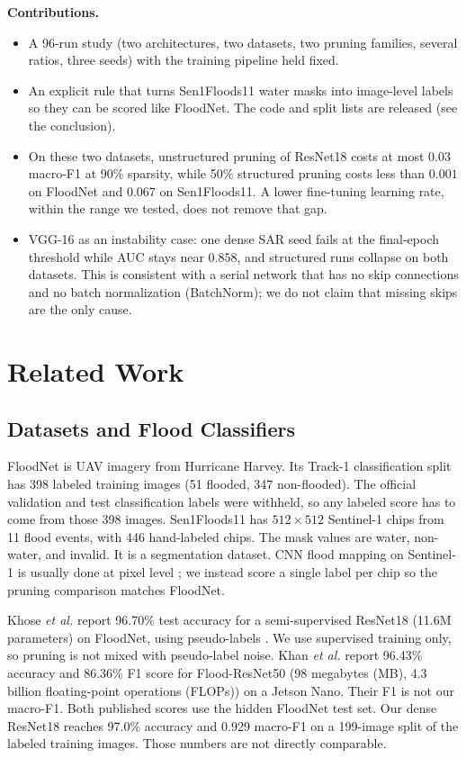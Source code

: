 \documentclass[conference]{IEEEtran}
\begin{document}
\noindent\textbf{Contributions.}
\begin{itemize}
\item A 96-run study (two architectures, two datasets, two pruning
families, several ratios, three seeds) with the training pipeline held
fixed.
\item An explicit rule that turns Sen1Floods11 water masks into
image-level labels so they can be scored like FloodNet. The code
and split lists are released (see the conclusion).
\item On these two datasets, unstructured pruning of ResNet18 costs at
most $0.03$ macro-F1 at 90\% sparsity, while 50\% structured pruning
costs less than $0.001$ on FloodNet and $0.067$ on Sen1Floods11.
A lower fine-tuning learning rate, within the range we tested, does
not remove that gap.
\item VGG-16 as an instability case: one dense SAR seed fails at the
final-epoch threshold while AUC stays near $0.858$, and structured
runs collapse on both datasets. This is consistent with a serial
network that has no skip connections and no batch normalization
(BatchNorm); we do not claim
that missing skips are the only cause.
\end{itemize}

\section{Related Work}
\subsection{Datasets and Flood Classifiers}
FloodNet \cite{rahnemoonfar2021floodnet} is UAV imagery from Hurricane
Harvey. Its Track-1 classification split has 398 labeled training
images (51 flooded, 347 non-flooded). The official validation and test
classification labels were withheld, so any labeled score has to come
from those 398 images. Sen1Floods11 \cite{bonafilia2020sen1floods11}
has $512\times512$ Sentinel-1 chips from 11 flood events, with 446
hand-labeled chips. The mask values are water, non-water, and invalid.
It is a segmentation dataset. CNN flood mapping on Sentinel-1 is
usually done at pixel level \cite{nemni2020flood}; we instead score a
single label per chip so the pruning comparison matches FloodNet.

Khose \emph{et al.} \cite{khose2021semisupervised} report 96.70\% test
accuracy for a semi-supervised ResNet18 (11.6M parameters) on FloodNet,
using pseudo-labels \cite{lee2013pseudo}. We use supervised training
only, so pruning is not mixed with pseudo-label noise. Khan \emph{et
al.} \cite{khan2023floodresnet50} report 96.43\% accuracy and 86.36\%
F1 score for Flood-ResNet50 (98 megabytes (MB), 4.3 billion
floating-point operations (FLOPs)) on a Jetson Nano.
Their F1 is not our macro-F1. Both published scores use the hidden
FloodNet test set. Our dense ResNet18 reaches 97.0\% accuracy and
0.929 macro-F1 on a 199-image split of the labeled training images.
Those numbers are not directly comparable.
\end{document}
